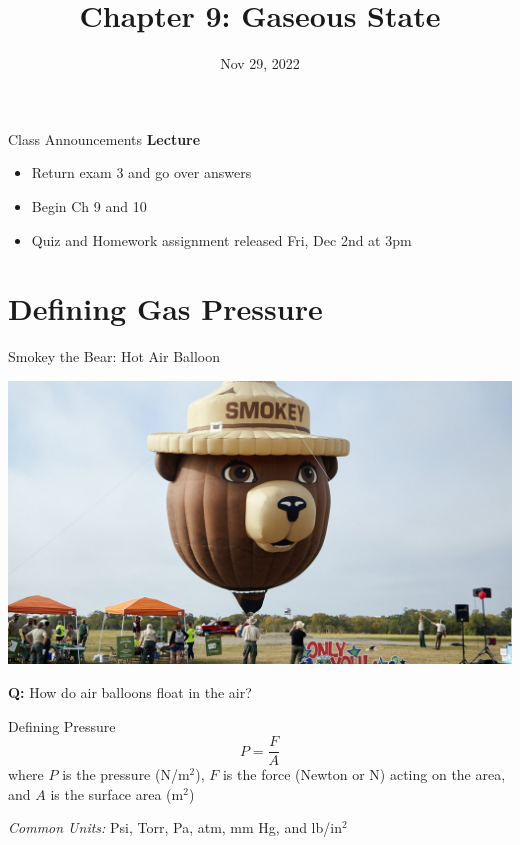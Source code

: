 \documentclass[11pt]{beamer}
\title{Chapter 9: Gaseous State}
\institute{Chemistry Department, Cypress College}
\date{Nov 29, 2022}
\begin{document}
\begin{frame}
  \titlepage
\end{frame}

\begin{frame}{Class Announcements}
  \textbf{Lecture}
  \begin{itemize}
  \item Return exam 3 and go over answers
  \item Begin Ch 9 and 10
  \item Quiz and Homework assignment released Fri, Dec
    2nd at 3pm
  \end{itemize}
\end{frame}

\section{Defining Gas Pressure}

\begin{frame}{Smokey the Bear: Hot Air Balloon}
  \begin{center}
    \includegraphics[scale=0.2]{smokey_air}
  \end{center}
  \textbf{Q:} How do air balloons float in the air?
\end{frame}

\begin{frame}{Defining Pressure}
  \begin{equation}
    P = \frac{F}{A}
  \end{equation}
  where $P$ is the pressure (N/m$^2$), $F$ is the force (Newton or N) acting on the area,
  and $A$ is the surface area (m$^2$)

  \textit{Common Units:} Psi, Torr, Pa, atm, mm Hg, and lb/in$^2$
\end{frame}
\end{document}
